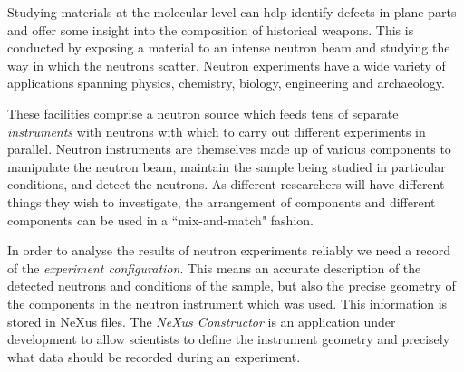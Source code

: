 \iffalse
The NeXus file format arose out of a desire to describe the configurations of neutron, muon, and X-ray experiments in a way that is ``facility-neutral." However, the format is not particularly easy to work with for the uninitiated. This can be especially frustrating to scientists who would much rather get their data and get on with their day. The NeXus Constructor, a tool being developed by software developers based at ISIS Pulsed Muon and Neutron Source in the UK and the European Spallation Source (ESS) in Sweden, attempts to address this problem by providing an interface for users to easily examine and modify the contents of NeXus files.
\fi
Studying materials at the molecular level can help identify defects in plane parts and offer some insight into the composition of historical weapons. This is conducted by exposing a material to an intense neutron beam and studying the way in which the neutrons scatter. Neutron experiments have a wide variety of applications spanning physics, chemistry, biology, engineering and archaeology.

\iffalse ISIS Pulsed Muon and Neutron Source at the Rutherford Appleton Laboratory in the UK is currently collaborating on software with the European Spallation Source (ESS) which is being built in Sweden. \fi These facilities comprise a neutron source which feeds tens of separate \textit{instruments} with neutrons with which to carry out different experiments in parallel. Neutron instruments are themselves made up of various components to manipulate the neutron beam, maintain the sample being studied in particular conditions, and detect the neutrons. As different researchers will have different things they wish to investigate, the arrangement of components and different components can be used in a ``mix-and-match" fashion.

In order to analyse the results of neutron experiments reliably we need a record of the \textit{experiment configuration}. This means an accurate description of the detected neutrons and conditions of the sample, but also the precise geometry of the components in the neutron instrument which was used. This information is stored in NeXus files. The \textit{NeXus Constructor} is an application under development to allow scientists to define the instrument geometry and precisely what data should be recorded during an experiment.

